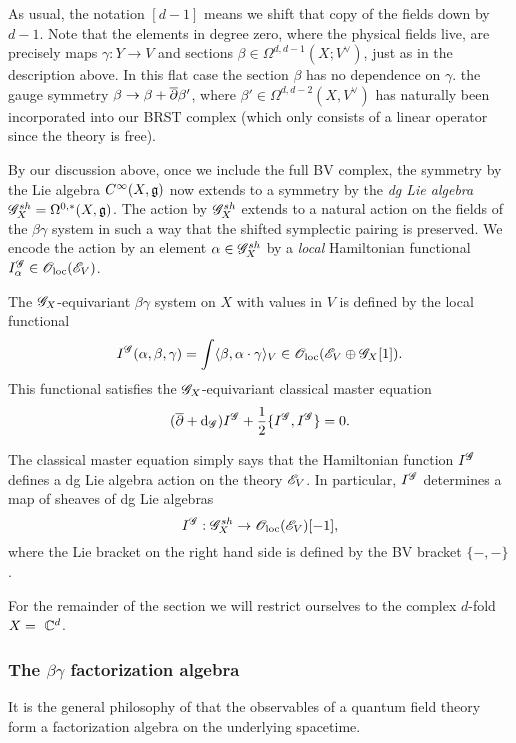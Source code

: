 \begin{rmk}
As usual, the notation $[d-1]$ means we shift that copy of the fields down by $d-1$. 
Note that the elements in degree zero, where the physical fields live, are precisely maps $\gamma : Y \to V$ and sections $\beta \in\Omega^{d,d-1} (X ; V^\vee)$, just as in the description above. 
In this flat case the section $\beta$ has no dependence on $\gamma$.
the gauge symmetry $\beta \to \beta + \overline{\partial} \beta'$, where $\beta' \in \Omega^{d,d-2} (X, V^\vee)$ has naturally been incorporated into our BRST complex (which only consists of a linear operator since the theory is free).
\end{rmk}

By our discussion above, once we include the full BV complex, the symmetry by the Lie algebra $C^\infty(X, \mathfrak g)$ now extends to a symmetry by the {\em dg Lie algebra} $\mathscr G_X^{sh} = \Omega^{0,*}(X, \mathfrak g)$. 
The action by $\mathscr G_X^{sh}$ extends to a natural action on the fields of the $\beta\gamma$ system in such a way that the shifted symplectic pairing is preserved. 
We encode the action by an element $\alpha \in \mathscr G_X^{sh}$ by a {\em local} Hamiltonian functional $I_\alpha^{\mathscr G} \in {\mathscr O}_{\rm loc}(\mathscr E_V)$. 

\begin{dfn/lem}
The $\mathscr G_X$-equivariant $\beta\gamma$ system on $X$ with values in $V$ is defined by the local functional
\[
I^{\mathscr G}(\alpha, \beta, \gamma) = \int \langle\beta, \alpha \cdot \gamma\rangle_V \in {\mathscr O}_{\rm loc}(\mathscr E_V \oplus \mathscr G_X[1]) .
\]
This functional satisfies the $\mathscr G_X$-equivariant classical master equation
\[
(\overline{\partial} + {\rm d}_{\mathscr G}) I^{\mathscr G} + \frac{1}{2} \{I^{\mathscr G}, I^{\mathscr G}\} = 0 .
\] 
\end{dfn/lem}

The classical master equation simply says that the Hamiltonian function $I^{\mathscr G}$ defines a dg Lie algebra action on the theory $\mathscr E_V$. 
In particular, $I^{\mathscr G}$ determines a map of sheaves of dg Lie algebras 
\[
I^{\mathscr G} : \mathscr G^{sh}_X \to {\mathscr O}_{\rm loc}(\mathscr E_V)[-1],
\] 
where the Lie bracket on the right hand side is defined by the BV bracket $\{-,-\}$. 

For the remainder of the section we will restrict ourselves to the complex $d$-fold $X =~\mathbb C^d$. 

\subsubsection{The $\beta\gamma$ factorization algebra}

It is the general philosophy of \cite{CG1,CG2} that the observables of a quantum field theory form a factorization algebra on the underlying spacetime. 

